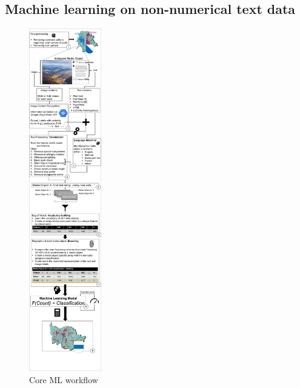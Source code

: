 
\clearpage

\subsection{Machine learning on non-numerical text data} \label{ml_text_data}

\begin{figure} %
    \centerline{\includegraphics[trim={0 0 0 0},clip,width=0.28\textwidth]{img/ML_text_data_visualization_cropped.pdf}}
  \caption{Core ML workflow}
  \label{fig:ml_visualisation}
\end{figure}
